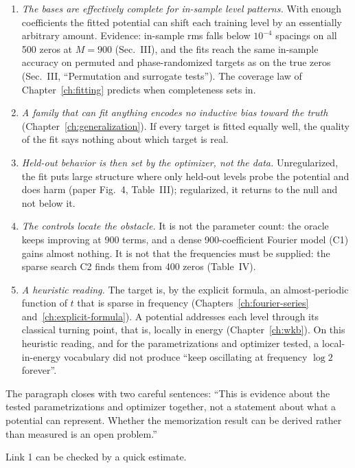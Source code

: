\begin{enumerate}
\item \emph{The bases are effectively complete for in-sample level patterns.} With enough coefficients the fitted potential can shift each training level by an essentially arbitrary amount. Evidence: in-sample rms falls below $10^{-4}$ spacings on all 500 zeros at $M=900$ (Sec.~III), and the fits reach the same in-sample accuracy on permuted and phase-randomized targets as on the true zeros (Sec.~III, ``Permutation and surrogate tests''). The coverage law of Chapter~\ref{ch:fitting} predicts when completeness sets in.
\item \emph{A family that can fit anything encodes no inductive bias toward the truth} (Chapter~\ref{ch:generalization}). If every target is fitted equally well, the quality of the fit says nothing about which target is real.
\item \emph{Held-out behavior is then set by the optimizer, not the data.} Unregularized, the fit puts large structure where only held-out levels probe the potential and does harm (paper Fig.~4, Table~III); regularized, it returns to the null and not below it.
\item \emph{The controls locate the obstacle.} It is not the parameter count: the oracle keeps improving at 900 terms, and a dense 900-coefficient Fourier model (C1) gains almost nothing. It is not that the frequencies must be supplied: the sparse search C2 finds them from 400 zeros (Table~IV).
\item \emph{A heuristic reading.} The target is, by the explicit formula, an almost-periodic function of $t$ that is sparse in frequency (Chapters~\ref{ch:fourier-series} and~\ref{ch:explicit-formula}). A potential addresses each level through its classical turning point, that is, locally in energy (Chapter~\ref{ch:wkb}). On this heuristic reading, and for the parametrizations and optimizer tested, a local-in-energy vocabulary did not produce ``keep oscillating at frequency $\log 2$ forever''.
\end{enumerate}
The paragraph closes with two careful sentences: ``This is evidence about the tested parametrizations and optimizer together, not a statement about what a potential can represent. Whether the memorization result can be derived rather than measured is an open problem.''

Link 1 can be checked by a quick estimate.

